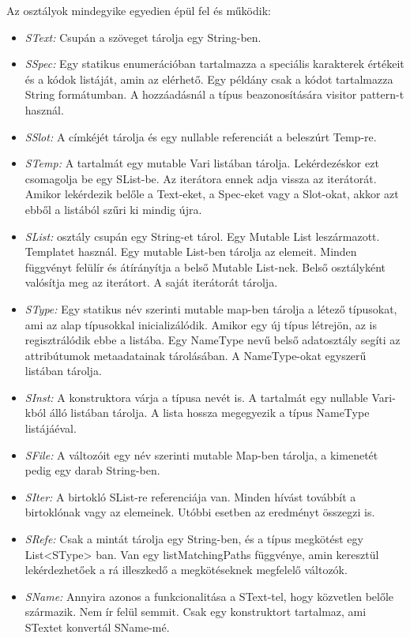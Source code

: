 {Az osztályok mindegyike egyedien épül fel és működik:
\begin{itemize}
\item \emph{SText:} 
Csupán a szöveget tárolja egy String-ben.
\item \emph{SSpec:} 
Egy statikus enumerációban tartalmazza a speciális karakterek értékeit és a kódok listáját, amin az elérhető.
Egy példány csak a kódot tartalmazza String formátumban.
A hozzáadásnál a típus beazonosítására visitor pattern-t használ. 
\item \emph{SSlot:} 
A címkéjét tárolja és egy nullable referenciát a beleszúrt Temp-re. 
\item \emph{STemp:} 
A tartalmát egy mutable Vari listában tárolja.
Lekérdezéskor ezt csomagolja be egy SList-be.
Az iterátora ennek adja vissza az iterátorát. 
Amikor lekérdezik belőle a Text-eket, a Spec-eket vagy a Slot-okat, akkor azt ebből a listából szűri ki mindig újra.
\item \emph{SList:} osztály csupán egy String-et tárol.
Egy Mutable List leszármazott.
Templatet használ.
Egy mutable List-ben tárolja az elemeit.
Minden függvényt felülír és átírányítja a belső Mutable List-nek.
Belső osztályként valósítja meg az iterátort.
A saját iterátorát tárolja. 
\item \emph{SType:} 
Egy statikus név szerinti mutable map-ben tárolja a létező típusokat, ami az alap típusokkal inicializálódik.
Amikor egy új típus létrejön, az is regisztrálódik ebbe a listába.
Egy NameType nevű belső adatosztály segíti az attribútumok metaadatainak tárolásában.
A NameType-okat egyszerű listában tárolja. 
\item \emph{SInst:} 
A konstruktora várja a típusa nevét is.
A tartalmát egy nullable Vari-kból álló listában tárolja. 
A lista hossza megegyezik a típus NameType listájáéval.
\item \emph{SFile:}
A változóit egy név szerinti mutable Map-ben tárolja, a kimenetét pedig egy darab String-ben.
\item \emph{SIter:}
A birtokló SList-re referenciája van.
Minden hívást továbbít a birtoklónak vagy az elemeinek.
Utóbbi esetben az eredményt összegzi is. 
\item \emph{SRefe:}
Csak a  mintát tárolja egy String-ben, és a típus megkötést egy List<SType> ban.
Van egy listMatchingPaths függvénye, amin keresztül lekérdezhetőek a rá illeszkedő a megkötéseknek megfelelő változók.
\item \emph{SName:} 
Annyira azonos a funkcionalitása a SText-tel, hogy közvetlen belőle származik.
Nem ír felül semmit.
Csak egy konstruktort tartalmaz, ami STextet konvertál SName-mé.
\end{itemize}

}
